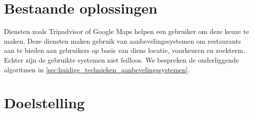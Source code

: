 \section{Bestaande oplossingen}
Diensten zoals Tripadvisor \cite{tripadvisor_algorithm} of Google Maps helpen een gebruiker om deze keuze te maken. Deze diensten maken gebruik van aanbevelingssystemen om restaurants aan te bieden aan gebruikers op basis van diens locatie, voorkeuren en zoekterm. Echter zijn de gebruikte systemen niet feilloos. We bespreken de onderliggende algoritmen in \autoref{sec:huidige_technieken_aanbevelingssystemen}.

\section{Doelstelling}


